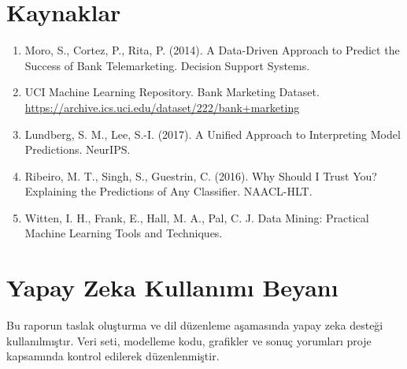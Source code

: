 \documentclass[11pt,a4paper]{article}
\begin{document}
\section*{Kaynaklar}
\begin{enumerate}
\item Moro, S., Cortez, P., Rita, P. (2014). A Data-Driven Approach to Predict the Success of Bank Telemarketing. Decision Support Systems.
\item UCI Machine Learning Repository. Bank Marketing Dataset. \url{https://archive.ics.uci.edu/dataset/222/bank+marketing}
\item Lundberg, S. M., Lee, S.-I. (2017). A Unified Approach to Interpreting Model Predictions. NeurIPS.
\item Ribeiro, M. T., Singh, S., Guestrin, C. (2016). Why Should I Trust You? Explaining the Predictions of Any Classifier. NAACL-HLT.
\item Witten, I. H., Frank, E., Hall, M. A., Pal, C. J. Data Mining: Practical Machine Learning Tools and Techniques.
\end{enumerate}

\section*{Yapay Zeka Kullanımı Beyanı}
Bu raporun taslak oluşturma ve dil düzenleme aşamasında yapay zeka desteği kullanılmıştır. Veri seti, modelleme kodu, grafikler ve sonuç yorumları proje kapsamında kontrol edilerek düzenlenmiştir.
\end{document}
